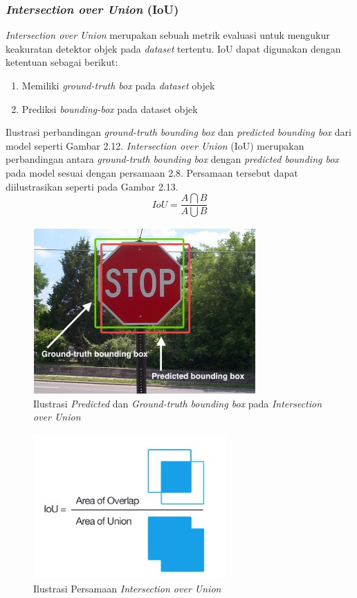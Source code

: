 \subsubsection{\emph{Intersection over Union} (IoU)}
\label{subsec:IoU}
\emph{Intersection over Union} merupakan sebuah metrik evaluasi untuk mengukur keakuratan detektor objek pada \emph{dataset} tertentu. IoU dapat
digunakan dengan ketentuan sebagai berikut:
\begin{enumerate}
  \item Memiliki \emph{ground-truth box} pada \emph{dataset} objek
  \item Prediksi \emph{bounding-box} pada dataset objek
\end{enumerate}
Ilustrasi perbandingan \emph{ground-truth bounding box} dan \emph{predicted bounding box} dari model seperti Gambar 2.12. \emph{Intersection over Union} (IoU) merupakan perbandingan
antara \emph{ground-truth bounding box} dengan \emph{predicted bounding box} pada model sesuai dengan persamaan 2.8. Persamaan tersebut dapat diilustrasikan seperti pada Gambar 2.13.
\begin{equation}
  IoU = \frac{A \bigcap B}{A \bigcup B}
\end{equation} 

\begin{figure}[ht]
  \centering
  \includegraphics[scale=1]{gambar/ilustrasi-iou.jpg}
  \caption{Ilustrasi \emph{Predicted} dan \emph{Ground-truth bounding box} pada \emph{Intersection over Union}}
  \label{fig:gambar-iou}
\end{figure}

\begin{figure}[ht]
  \centering
  \includegraphics[scale=0.8]{gambar/ilustrasi-iou-rumus.jpg}
  \caption{Ilustrasi Persamaan \emph{Intersection over Union}}
  \label{fig:gambar-iou-rumus}
\end{figure}

